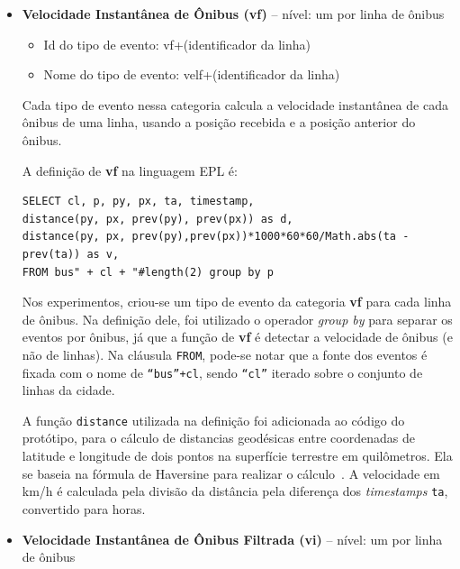 \begin{itemize}    
    \item \textbf{Velocidade Instantânea de Ônibus (vf)} -- nível: um por linha de ônibus
    \begin{itemize}
        \item  Id do tipo de evento: vf+(identificador da linha)
        \item Nome do tipo de evento: velf+(identificador da linha)
    \end{itemize}
   
    
    
    Cada tipo de evento nessa categoria calcula a velocidade instantânea de cada ônibus de uma linha, usando a posição recebida e a posição anterior do ônibus. %
    
    A definição de \textbf{vf} na linguagem EPL é:
\begin{verbatim}
SELECT cl, p, py, px, ta, timestamp, 
distance(py, px, prev(py), prev(px)) as d,
distance(py, px, prev(py),prev(px))*1000*60*60/Math.abs(ta - prev(ta)) as v,
FROM bus" + cl + "#length(2) group by p 
\end{verbatim}

    Nos experimentos, criou-se um tipo de evento da categoria \textbf{vf} para cada linha de ônibus. Na definição dele, foi utilizado o operador \textit{group by} para separar os eventos por ônibus, já que a função de \textbf{vf} é detectar a velocidade de ônibus (e não de linhas). Na cláusula \texttt{FROM}, pode-se notar que a fonte dos eventos é fixada com o nome de \texttt{``bus''+cl}, sendo \texttt{``cl''} iterado sobre o conjunto de linhas da cidade. 
    
    A função \texttt{distance} utilizada na definição foi adicionada ao código do protótipo, para o cálculo de distancias geodésicas entre coordenadas de latitude e longitude de dois pontos na superfície terrestre em quilômetros. Ela se baseia na fórmula de Haversine para realizar o cálculo~\citep{Haversine}. A velocidade em km/h é calculada pela divisão da distância pela diferença dos \textit{timestamps} \texttt{ta}, convertido para horas.
 
    \item \textbf{Velocidade Instantânea de Ônibus Filtrada (vi)}  -- nível: um por linha de ônibus
    

\end{itemize}
